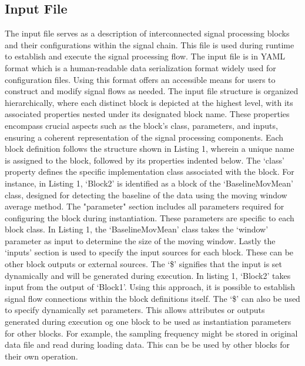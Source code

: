 \documentclass[journal]{IEEEtran}
\begin{document}
\subsection{Input File}
The input file serves as a description of interconnected signal processing blocks and their configurations within the signal chain. This file is used during runtime to establish and execute the signal processing flow. The input file is in YAML format which is a human-readable data serialization format \cite{OfficialYAMLWeb}widely used for configuration files. Using this format offers an accessible means for users to construct and modify signal flows as needed. The input file structure is organized hierarchically, where each distinct block is depicted at the highest level, with its associated properties nested under its designated block name. These properties encompass crucial aspects such as the block's class, parameters, and inputs, ensuring a coherent representation of the signal processing components. Each block definition follows the structure shown in Listing 1, wherein a unique name is assigned to the block, followed by its properties indented below. The ‘class’ property defines the specific implementation class associated with the block. For instance, in Listing 1, ‘Block2’ is identified as a block of the ‘BaselineMovMean’ class, designed for detecting the baseline of the data using the moving window average method. The "parameter" section includes all parameters required for configuring the block during instantiation. These parameters are specific to each block class. In Listing 1, the ‘BaselineMovMean’ class takes the ‘window’ parameter as input to determine the size of the moving window.  Lastly the ‘inputs’ section is used to specify the input sources for each block. These can be other block outputs or external sources. The ‘\$’ signifies that the input is set dynamically and will be generated during execution. In listing 1, ‘Block2’ takes input from the output of ‘Block1’. Using this approach, it is possible to establish signal flow connections within the block definitions itself. The ‘\$’ can also be used to specify dynamically set parameters. This allows attributes or outputs generated during execution og one block to be used as instantiation parameters for other blocks. For example, the sampling frequency might be stored in original data file and read during loading data. This can be be used by other blocks for their own operation.




\end{document}
